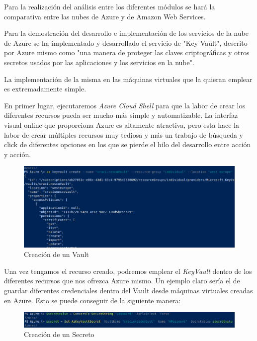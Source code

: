 \documentclass[english,runningheads,a4paper]{llncs}[2018/03/10]
\begin{document}
Para la realización del análisis entre los diferentes módulos se hará la
comparativa entre las nubes de Azure y de Amazon Web Services.

Para la demostración del desarrollo e implementación de los servicios de la nube
de Azure se ha implementado y desarrollado el servicio de "Key Vault", descrito
por Azure mismo como "una manera de proteger las claves criptográficas y otros
secretos usados por las aplicaciones y los servicios en la nube".

La implementación de la misma en las máquinas virtuales que la quieran emplear
es extremadamente simple.

En primer lugar, ejecutaremos \textit{Azure Cloud Shell} para que la labor de
crear los diferentes recursos pueda ser mucho más simple y automatizable. La
interfaz visual online que proporciona Azure es altamente atractiva, pero esta
hace la labor de crear múltiples recursos muy tediosa y más un trabajo de
búsqueda y click de diferentes opciones en los que se pierde el hilo del
desarrollo entre acción y acción.

\begin{figure}[h!]
    \includegraphics[width=\linewidth]{./Seguridad/Azure/Selection_011.png}
    \caption{Creación de un Vault}
\end{figure}

Una vez tengamos el recurso creado, podremos emplear el \textit{KeyVault} dentro
de los diferentes recursos que nos ofrezca Azure mismo. Un ejemplo claro sería
el de guardar diferentes credenciales dentro del Vault desde máquinas virtuales
creadas en Azure. Esto se puede conseguir de la siguiente manera:

\begin{figure}[h!]
    \includegraphics[width=\linewidth]{./Seguridad/Azure/Selection_012.png}
    \caption{Creación de un Secreto}
\end{figure}
\end{document}
